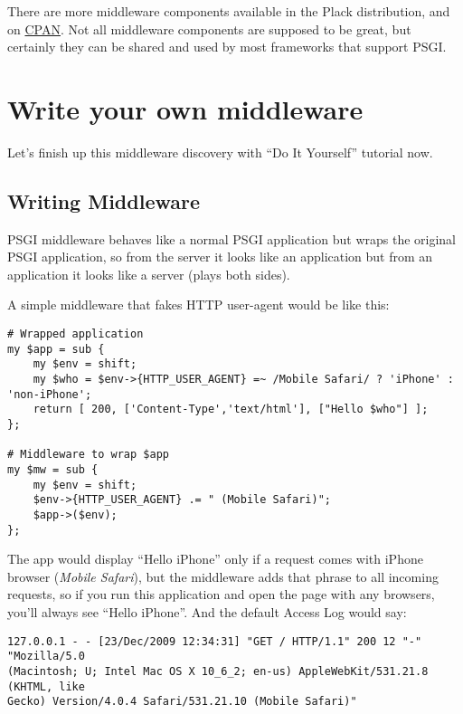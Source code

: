 There are more middleware components available in the Plack
distribution, and on
\href{http://search.cpan.org/search?query=plack+middleware\&mode=dist}{CPAN}.
Not all middleware components are supposed to be great, but certainly
they can be shared and used by most frameworks that support PSGI.

\chapter{Write your own
middleware}\label{day-23-write-your-own-middleware}

Let's finish up this middleware discovery with ``Do It Yourself''
tutorial now.

\section{Writing Middleware}\label{writing-middleware}

PSGI middleware behaves like a normal PSGI application but wraps the
original PSGI application, so from the server it looks like an
application but from an application it looks like a server (plays both
sides).

A simple middleware that fakes HTTP user-agent would be like this:

\begin{lstlisting}
# Wrapped application
my $app = sub {
    my $env = shift;
    my $who = $env->{HTTP_USER_AGENT} =~ /Mobile Safari/ ? 'iPhone' : 'non-iPhone';
    return [ 200, ['Content-Type','text/html'], ["Hello $who"] ];
};

# Middleware to wrap $app
my $mw = sub {
    my $env = shift;
    $env->{HTTP_USER_AGENT} .= " (Mobile Safari)";
    $app->($env);
};
\end{lstlisting}

The app would display ``Hello iPhone'' only if a request comes with
iPhone browser (\emph{Mobile Safari}), but the middleware adds that
phrase to all incoming requests, so if you run this application and open
the page with any browsers, you'll always see ``Hello iPhone''. And the
default Access Log would say:

\begin{lstlisting}
127.0.0.1 - - [23/Dec/2009 12:34:31] "GET / HTTP/1.1" 200 12 "-" "Mozilla/5.0 
(Macintosh; U; Intel Mac OS X 10_6_2; en-us) AppleWebKit/531.21.8 (KHTML, like
Gecko) Version/4.0.4 Safari/531.21.10 (Mobile Safari)"
\end{lstlisting}

